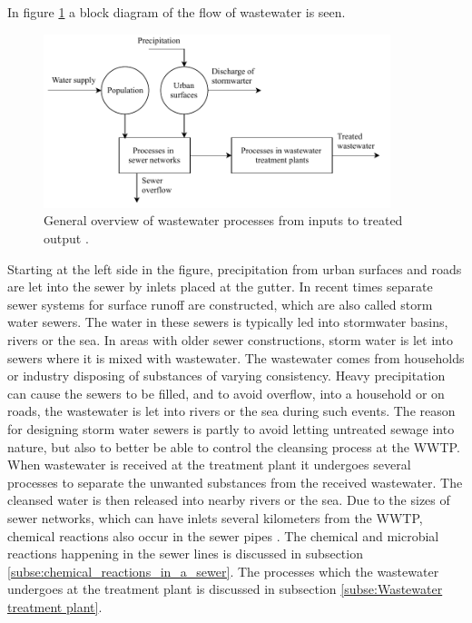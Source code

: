 In figure \ref{fig:sewer_overview_of_the_different_parts} a block diagram of the flow of wastewater is seen.
\begin{figure}[H]
\centering
\includegraphics[width=0.9\textwidth]{report/introduction/pictures/sewer_process2.pdf}
\caption{General overview of wastewater processes from inputs to treated output \cite{Sewer_processes}.}
\label{fig:sewer_overview_of_the_different_parts}
\end{figure}

Starting at the left side in the figure, precipitation from urban surfaces and roads are let into the sewer by inlets placed at the gutter. In recent times separate sewer systems for surface runoff are constructed, which are also called storm water sewers. The water in these sewers is typically led into stormwater basins, rivers or the sea. In areas with older sewer constructions, storm water is let into sewers where it is mixed with wastewater. The wastewater comes from households or industry disposing of substances of varying consistency. Heavy precipitation can cause the sewers to be filled, and to avoid overflow, into a household or on roads, the wastewater is let into rivers or the sea during such events. 
The reason for designing storm water sewers is partly to avoid letting untreated sewage into nature, but also to better be able to control the cleansing process at the WWTP. %
When wastewater is received at the treatment plant it undergoes several processes to separate the unwanted substances from the received wastewater. The cleansed water is then released into nearby rivers or the sea.
Due to the sizes of sewer networks, which can have inlets several kilometers from the WWTP, chemical reactions also occur in the sewer pipes \cite{Sewer_processes}.
The chemical and microbial reactions happening in the sewer lines is discussed in subsection \ref{subse:chemical_reactions_in_a_sewer}. The processes which the wastewater undergoes at the treatment plant is discussed in subsection \ref{subse:Wastewater treatment plant}.  

